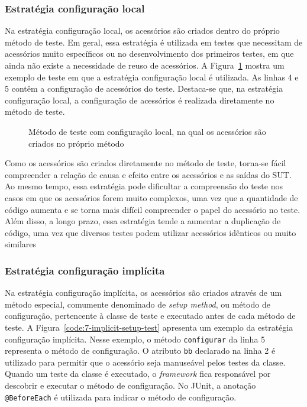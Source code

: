\subsubsection{Estratégia configuração local}

Na estratégia configuração local, os acessórios são criados dentro do próprio método de teste. Em geral, essa estratégia é utilizada em testes que necessitam de acessórios muito específicos ou no desenvolvimento dos primeiros testes, em que ainda não existe a necessidade de reuso de acessórios. A Figura~\ref{code:6-inline-setup-test} mostra um exemplo de teste em que a estratégia configuração local é utilizada. As linhas 4 e 5 contêm a configuração de acessórios do teste. Destaca-se que, na estratégia configuração local, a configuração de acessórios é realizada diretamente no método de teste.

\begin{figure}[htb]
	\centering
	
	\caption{Método de teste com configuração local, na qual os acessórios são criados no próprio método}
	\label{code:6-inline-setup-test}
\end{figure}

Como os acessórios são criados diretamente no método de teste, torna-se fácil compreender a relação de causa e efeito entre os acessórios e as saídas do SUT. Ao mesmo tempo, essa estratégia pode dificultar a compreensão do teste nos casos em que os acessórios forem muito complexos, uma vez que a quantidade de código aumenta e se torna mais difícil compreender o papel do acessório no teste. Além disso, a longo prazo, essa estratégia tende a aumentar a duplicação de código, uma vez que diversos testes podem utilizar acessórios idênticos ou muito similares

\subsubsection{Estratégia configuração implícita}

Na estratégia configuração implícita, os acessórios são criados através de um método especial, comumente denominado de \textit{setup method}, ou método de configuração, pertencente à classe de teste e executado antes de cada método de teste. A Figura~\ref{code:7-implicit-setup-test} apresenta um exemplo da estratégia configuração implícita. Nesse exemplo, o método \texttt{configurar} da linha 5 representa o método de configuração. O atributo \texttt{bb} declarado na linha 2 é utilizado para permitir que o acessório seja manuseável pelos testes da classe. Quando um teste da classe é executado, o \textit{framework} fica responsável por descobrir e executar o método de configuração. No JUnit, a anotação \texttt{@BeforeEach} é utilizada para indicar o método de configuração.

